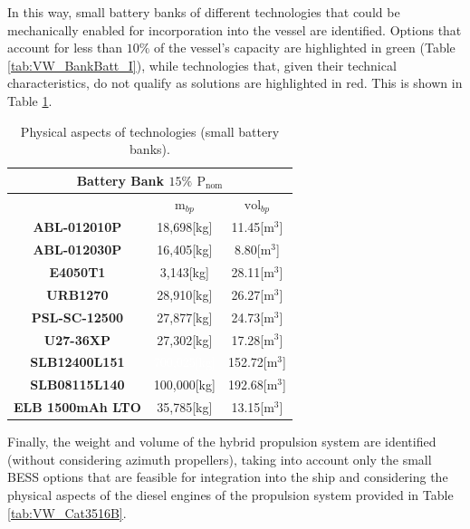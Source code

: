 In this way, small battery banks of different technologies that could be mechanically enabled for incorporation into the vessel are identified. Options that account for less than $10\%$ of the vessel's capacity are highlighted in green (Table \ref{tab:VW_BankBatt_I}), while technologies that, given their technical characteristics, do not qualify as solutions are highlighted in red. This is shown in Table \ref{tab:VW_techbatts_015}.

\begin{table}[H]
	\centering
	\caption{Physical aspects of technologies (small battery banks).}
	\label{tab:VW_techbatts_015}
	\begin{tabular}{|c|c|c|}
		\hline
		\multicolumn{3}{|c|}{Battery Bank $15\%$ ${\text{P}}_{\text{nom}}$} \\
		\hline\hline
		 &  $\text{m}_{bp}$ & $\text{vol}_{bp}$\\
		 \hline
		 \textbf{ABL-012010P} & \cellcolor[HTML]{81DE76}18,698[kg]  & \cellcolor[HTML]{81DE76}11.45[${\text{m}}^{3}$] \\
		 \hline	
		 \textbf{ABL-012030P} & \cellcolor[HTML]{81DE76}16,405[kg]  & \cellcolor[HTML]{81DE76}8.80[${\text{m}}^{3}$] \\
		 \hline
		 \textbf{E4050T1} &  \cellcolor[HTML]{81DE76}3,143[kg] &  28.11[${\text{m}}^{3}$]\\
		 \hline\hline
		 \textbf{URB1270} & 28,910[kg]  & 26.27[${\text{m}}^{3}$] \\
		 \hline
		 \textbf{PSL-SC-12500} & 27,877[kg]  & 24.73[${\text{m}}^{3}$] \\
		 \hline
		 \textbf{U27-36XP} & 27,302[kg]  & \cellcolor[HTML]{81DE76}17.28[${\text{m}}^{3}$] \\
		 \hline\hline
		 \textbf{SLB12400L151} & \cellcolor[HTML]{CC444B} \textcolor{white}{700,025[kg]}  & 152.72[${\text{m}}^{3}$] \\
		 \hline
		 \textbf{SLB08115L140} & 100,000[kg]  & 192.68[${\text{m}}^{3}$] \\
		 \hline
		 \textbf{ELB 1500mAh LTO} & 35,785[kg]  & \cellcolor[HTML]{81DE76}13.15[${\text{m}}^{3}$] \\
		 \hline	
	\end{tabular}
\end{table}

Finally, the weight and volume of the hybrid propulsion system are identified (without considering azimuth propellers), taking into account only the small BESS options that are feasible for integration into the ship and considering the physical aspects of the diesel engines of the propulsion system provided in Table \ref{tab:VW_Cat3516B}.


